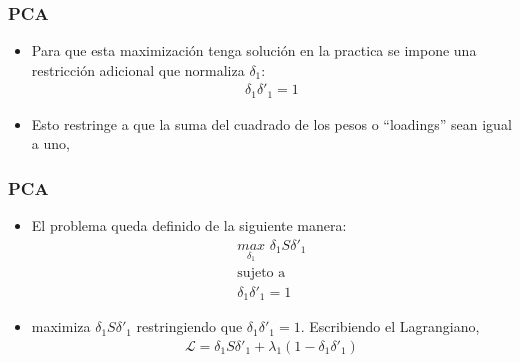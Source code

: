 \documentclass[
  shownotes,
  xcolor={svgnames},
  hyperref={colorlinks,citecolor=DarkBlue,linkcolor=DarkRed,urlcolor=DarkBlue}
  , aspectratio=169]{beamer}
\begin{document}
\begin{frame}
\frametitle{PCA}

\begin{itemize}

  \item Para que esta maximización tenga solución en la practica se impone una restricción adicional que normaliza \(\delta_1\):
\medskip
\begin{align}
\delta_1\delta'_1=1
\end{align}

\item Esto restringe a que la suma del cuadrado de los pesos o ``loadings'' sean igual a uno, 
\end{itemize}
\end{frame}
\begin{frame}
\frametitle{PCA}


\begin{itemize}

  \item El problema queda definido de la siguiente manera:
\medskip
\begin{align}
\underset{\delta_1}{max}\,\, \delta_1 S \delta'_1 \\ 
\text{sujeto a}  \\ 
\delta_1 \delta'_1 = 1 
\end{align}
\medskip
\item maximiza \(\delta_1 S \delta'_1\) restringiendo que \(\delta_1\delta'_1=1\). Escribiendo el Lagrangiano,
\medskip
\begin{align}
\mathcal{L} = \delta_1 S \delta'_1 + \lambda_1 (1-\delta_1\delta'_1)
\end{align}
\end{itemize}

\end{frame}
\end{document}
